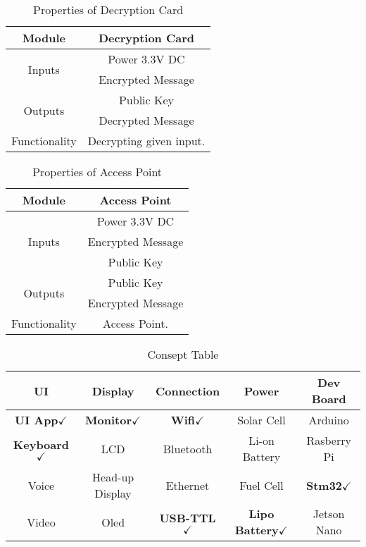 \documentclass[12pt]{article}
\begin{document}
\begin{table}[h]

	\centering	
	\label{Properties of Decryption Card }
	\begin{tabular}{|c|c|}
	\hline
	Module & Decryption Card\\ \hline
		\multirow{2}{*}{Inputs} & Power 3.3V DC \\ \cline{2-2}
	& Encrypted Message \\ \hline
		\multirow{2}{*}{Outputs} & Public Key \\ \cline{2-2}
	& Decrypted Message \\ \hline
	Functionality & Decrypting given input.\\ \hline	
		
	\end{tabular}
	\caption{Properties of Decryption Card}

\end{table}
	\begin{table}[H]

		\centering		
		\label{Properties of Access Point }
		\begin{tabular}{|c|c|}
			\hline
			Module & Access Point \\ \hline
			\multirow{3}{*}{Inputs} & Power 3.3V DC \\
			
			\cline{2-2}
				& Encrypted Message \\
		
			\cline{2-2}
				& Public Key \\
			\cline{2-2} \hline
	
				\multirow{2}{*}{Outputs} 	& Public Key \\
			\cline{2-2}
			& Encrypted Message \\
			
			\cline{2-2} \hline
			
			Functionality & Access Point.\\ \hline	
	
		\end{tabular}
		\caption{Properties of Access Point}

	\end{table}
	
	\begin{table}[H]
	\centering
	\begin{tabular}{|c|c|c|c|c|}
		\hline
		UI & Display & Connection & Power & Dev Board \\
		\hline
		\textbf{UI App}$\checkmark$
		 &\textbf{Monitor}$\checkmark$
		   & \textbf{Wifi}$\checkmark$
		   & Solar Cell & Arduino\\
		\hline
		\textbf{Keyboard}$\checkmark$
		 & LCD & Bluetooth & Li-on Battery & Rasberry Pi \\
		\hline
		Voice & Head-up Display & Ethernet & Fuel Cell &\textbf{Stm32}$\checkmark$
		 \\
		\hline
		Video & Oled &\textbf{USB-TTL}$\checkmark$  & \textbf{Lipo Battery}$\checkmark$
		 & Jetson Nano \\
		\hline
	\end{tabular}
	\caption{Consept Table}
\end{table}
\end{document}
